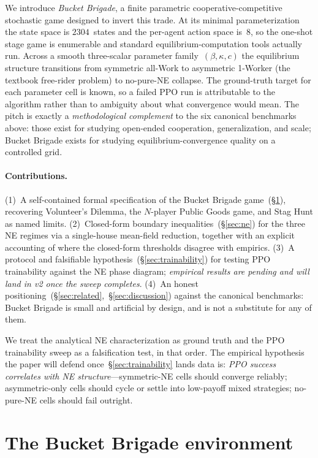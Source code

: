 \documentclass{anvil-paper}
\begin{document}
We introduce \emph{Bucket Brigade}, a finite parametric cooperative-competitive
stochastic game designed to invert this trade. At its minimal parameterization
the state space is $2304$~states and the per-agent action space is~$8$, so the
one-shot stage game is enumerable and standard equilibrium-computation tools
actually run. Across a smooth three-scalar parameter family~$(\beta,\kappa,c)$
the equilibrium structure transitions from symmetric all-Work to asymmetric
1-Worker (the textbook free-rider problem) to no-pure-NE collapse. The
ground-truth target for each parameter cell is known, so a failed PPO run is
attributable to the algorithm rather than to ambiguity about what convergence
would mean. The pitch is exactly a \emph{methodological complement} to the
six canonical benchmarks above: those exist for studying open-ended
cooperation, generalization, and scale; Bucket Brigade exists for studying
equilibrium-convergence quality on a controlled grid.

\paragraph{Contributions.} (1)~A self-contained formal specification of the
Bucket Brigade game~(\S\ref{sec:env}), recovering Volunteer's Dilemma, the
$N$-player Public Goods game, and Stag Hunt as named limits.
(2)~Closed-form boundary inequalities~(\S\ref{sec:ne}) for the three NE
regimes via a single-house mean-field reduction, together with an explicit
accounting of where the closed-form thresholds disagree with empirics.
(3)~A protocol and falsifiable hypothesis~(\S\ref{sec:trainability}) for
testing PPO trainability against the NE phase diagram; \emph{empirical
results are pending and will land in v2 once the sweep completes}. (4)~An
honest positioning~(\S\ref{sec:related},~\S\ref{sec:discussion}) against the
canonical benchmarks: Bucket Brigade is small and artificial by design, and
is not a substitute for any of them.

We treat the analytical NE characterization as ground truth and the PPO
trainability sweep as a falsification test, in that order. The empirical
hypothesis the paper will defend once~\S\ref{sec:trainability} lands data is:
\emph{PPO success correlates with NE structure}---symmetric-NE cells should
converge reliably; asymmetric-only cells should cycle or settle into
low-payoff mixed strategies; no-pure-NE cells should fail outright.

\section{The Bucket Brigade environment}
\label{sec:env}
\end{document}
